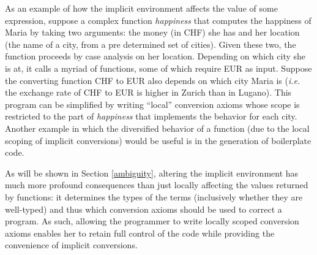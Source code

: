 As an example of how the implicit environment affects the value of some expression, suppose a complex function \textit{happiness} that computes the happiness of Maria by taking two arguments: the money (in CHF) she has and her location (the name of a city, from a pre determined set of cities). Given these two, the function proceeds by case analysis on her location. Depending on which city she is at, it calls a myriad of functions, some of which require EUR as input. Suppose the converting function CHF to EUR also depends on which city Maria is (\textit{i.e.} the exchange rate of CHF to EUR is higher in Zurich than in Lugano). This program can be simplified by writing ``local'' conversion axioms whose scope is restricted to the part of \textit{happiness} that implements the behavior for each city. Another example in which the diversified behavior of a function (due to the local scoping of implicit conversions) would be useful is in the generation of boilerplate code.


As will be shown in Section \ref{ambiguity}, altering the implicit environment has much more profound consequences than just locally affecting the values returned by functions: it determines the types of the terms (inclusively whether they are well-typed) and thus which conversion axioms should be used to correct a program. As such, allowing the programmer to write locally scoped conversion axioms enables her to retain full control of the code while providing the convenience of implicit conversions. 





